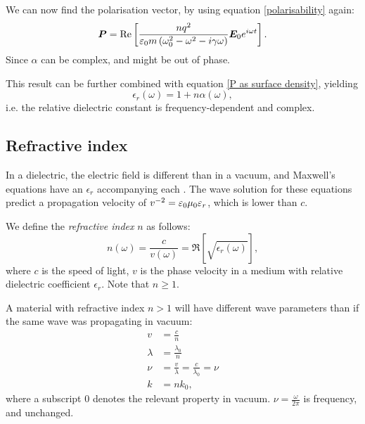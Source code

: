     We can now find the polarisation vector, by using equation \eqref{polarisability} again: 
    \begin{equation}
        \bm{P} = \Re\left[\frac{nq^2}{\varepsilon_0 m\left(\omega_0^2 - \omega^2 - i\gamma\omega\right)}\bm{E}_0e^{i\omega t}\right].
    \end{equation}
    Since $\alpha$ can be complex, \p{} and \E{} might be out of phase.

    This result can be further combined with equation \eqref{P as surface density}, yielding
    \begin{equation}
        \epsilon_r(\omega) = 1 + n\alpha(\omega),
    \end{equation}
    i.e. the relative dielectric constant is frequency-dependent and complex. 

\subsection{Refractive index}

    In a dielectric, the electric field is different than in a vacuum, and Maxwell's equations have an $\epsilon_r$ accompanying each \e. 
    The wave solution for these equations predict a propagation velocity of $v^{-2} = \varepsilon_0\mu_0\varepsilon_r$, which is lower than $c$. 
    
    We define the \textit{refractive index} $n$ as follows: 
    \begin{equation}
        n(\omega) = \frac{c}{v(\omega)} = \Re\left[\sqrt{\epsilon_r(\omega)}\right],
    \end{equation}
    where $c$ is the speed of light, $v$ is the phase velocity
    in a medium with relative dielectric coefficient $\epsilon_r$. Note that $n \geq 1$.

    A material with refractive index $n > 1$ will have different wave parameters than if the same wave was propagating in vacuum: 
    \begin{align*}
        v &= \frac{c}{n} \\
        \lambda &= \frac{\lambda_0}{n} \\
        \nu &= \frac{v}{\lambda} = \frac{c}{\lambda_0} = \nu \\
        k &= nk_0,
    \end{align*}
    where a subscript $0$ denotes the relevant property in vacuum. $\nu = \frac{\omega}{2\pi}$ is frequency, and unchanged.

